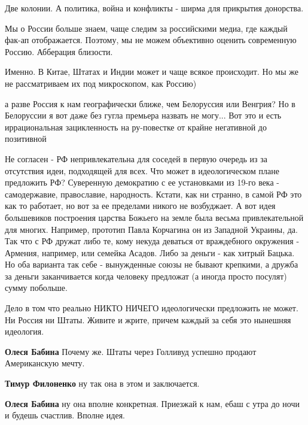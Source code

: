 \begin{itemize}
Две колонии. А политика, война и конфликты - ширма для прикрытия донорства.


Мы о России больше знаем, чаще следим за российскими медиа, где каждый фак-ап
отображается. Поэтому, мы не можем объективно оценить современную Россию.
Абберация близости.

\begin{itemize} %
Именно. В Китае, Штатах и Индии может и чаще всякое происходит. Но мы же не рассматриваем их под микроскопом, как Россию)


а разве Россия к нам географически ближе, чем Белоруссия или Венгрия? Но в
Белоруссии я вот даже без гугла премьера назвать не могу... Вот это и есть
иррациональная зацикленность на ру-повестке от крайне негативной до позитивной

\end{itemize} %


Не согласен - РФ непривлекательна для соседей в первую очередь из за отсутствия
идеи, подходящей для всех. Что может в идеологическом плане предложить РФ?
Суверенную демократию с ее установками из 19-го века - самодержавие,
православие, народность. Кстати, как ни странно, в самой РФ это как то
работает, но вот за ее пределами никого не возбуджает. А вот идея большевиков
построения царства Божьего на земле была весьма привлекательной для многих.
Например, прототип Павла Корчагина он из Западной Украины, да. Так что с РФ
дружат либо те, кому некуда деваться от враждебного окружения - Армения,
например, или семейка Асадов. Либо за деньги - как хитрый Бацька. Но оба
варианта так себе - вынужденные союзы не бывают крепкими, а дружба за деньги
заканчивается когда человеку предложат (а иногда просто посулят) сумму
побольше.

\begin{itemize} %
Дело в том что реально НИКТО НИЧЕГО идеологически предложить не может. Ни Россия ни Штаты. Живите и жрите, причем каждый за себя это нынешняя идеология.

\textbf{Олеся Бабина} Почему же. Штаты через Голливуд успешно продают Американскую мечту.

\textbf{Тимур Филоненко} ну так она в этом и заключается.

\textbf{Олеся Бабина} ну она вполне конкретная. Приезжай к нам, ебаш с утра до ночи и будешь счастлив. Вполне идея.
\end{itemize} %


\end{itemize}
